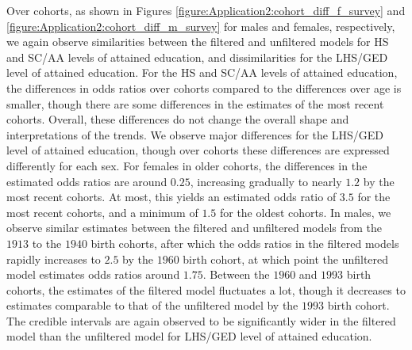\vspace{-0.2cm}
Over cohorts, as shown in Figures \ref{figure:Application2:cohort_diff_f_survey} and \ref{figure:Application2:cohort_diff_m_survey} for males and females, respectively, we again observe similarities between the filtered and unfiltered models for HS and SC/AA levels of attained education, and dissimilarities for the LHS/GED level of attained education. For the HS and SC/AA levels of attained education, the differences in odds ratios over cohorts compared to the differences over age is smaller, though there are some differences in the estimates of the most recent cohorts. Overall, these differences do not change the overall shape and interpretations of the trends. We observe major differences for the LHS/GED level of attained education, though over cohorts these differences are expressed differently for each sex. For females in older cohorts, the differences in the estimated odds ratios are around $0.25$, increasing gradually to nearly $1.2$ by the most recent cohorts. At most, this yields an estimated odds ratio of $3.5$ for the most recent cohorts, and a minimum of $1.5$ for the oldest cohorts. In males, we observe similar estimates between the filtered and unfiltered models from the $1913$ to the $1940$ birth cohorts, after which the odds ratios in the filtered models rapidly increases to $2.5$ by the $1960$ birth cohort, at which point the unfiltered model estimates odds ratios around $1.75$. Between the $1960$ and $1993$ birth cohorts, the estimates of the filtered model fluctuates a lot, though it decreases to estimates comparable to that of the unfiltered model by the $1993$ birth cohort. The credible intervals are again observed to be significantly wider in the filtered model than the unfiltered model for LHS/GED level of attained education. 

